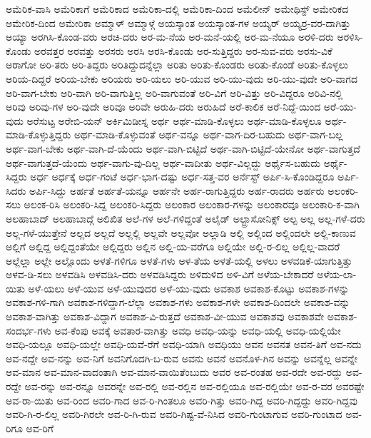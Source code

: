 {ಅಮೆರಿಕ-ವಾಸಿ
ಅಮೆರಿಕಾಗೆ
ಅಮೆರಿಕಾದ
ಅಮೆರಿಕಾ-ದಲ್ಲಿ
ಅಮೆರಿಕಾ-ದಿಂದ
ಅಮೆಲೀನ್
ಅಮೇಥಿಸ್ಟ್
ಅಮೇರಿಕದ
ಅಮೇರಿಕ-ದಿಂದ
ಅಮೇರಿಕಾ
ಅಮ್ಮಾಳ್
ಅಮ್ಮಾಳ್ಗೆ
ಅಯಸ್ಕಾಂತ
ಅಯಸ್ಕಾಂತ-ಗಳ
ಅಯ್ಯರ್
ಅಯ್ಯರ್ರ-ವರ-ದಾಗಿತ್ತು
ಅಯ್ಯಾ
ಅರಗಿಸಿ-ಕೊಂಡ-ವರು
ಅರಚಿ-ದರು
ಅರ-ಮ-ನೆಯ
ಅರ-ಮನೆ-ಯಲ್ಲಿ
ಅರ-ಮ-ನೆಯೂ
ಅರಳಿ-ದರು
ಅರಳಿಸಿ-ಕೊಂಡು
ಅರವತ್ತರ
ಅರವತ್ತು
ಅರಸರು
ಅರಸಿ
ಅರಸಿ-ಕೊಂಡು
ಅರ-ಸುತ್ತಿದ್ದರು
ಅರ-ಸುವ-ವರು
ಅರಸು-ವಿಕೆ
ಅರಾಗೋ
ಅರಿ-ತರು
ಅರಿ-ತಿದ್ದರು
ಅರಿತಿದ್ದುದನ್ನೆಲ್ಲಾ
ಅರಿತು
ಅರಿತು-ಕೊಂಡರು
ಅರಿತು-ಕೊಂಡೆ
ಅರಿತು-ಕೊಳ್ಳಲು
ಅರಿಯ-ದಿದ್ದರೆ
ಅರಿಯ-ಬೇಕು
ಅರಿಯರು
ಅರಿ-ಯಲು
ಅರಿ-ಯುವ
ಅರಿ-ಯು-ವುದು
ಅರಿ-ಯು-ವುದೇ
ಅರಿ-ವಾಗದ
ಅರಿ-ವಾಗ-ಬೇಕು
ಅರಿ-ವಾಗಿ
ಅರಿ-ವಾಗುತ್ತಿಲ್ಲ
ಅರಿ-ವಾಗುವಂತೆ
ಅರಿ-ವಿಗೆ
ಅರಿ-ವಿತ್ತು
ಅರಿ-ವಿದ್ದರೂ
ಅರಿವಿ-ನಲ್ಲಿ
ಅರಿವು
ಅರಿವು-ಗಳ
ಅರಿ-ವುದೇ
ಅರಿವೂ
ಅರಿವೇ
ಅರುಹಿ-ದರು
ಅರುಹಿದೆ
ಅರೆ-ಕಾಲಿಕ
ಅರೆ-ನಿದ್ದೆ-ಯಿಂದ
ಅರೆ-ಯು-ವುದು
ಅರೆಸುಟ್ಟ
ಅರೇಬಿ-ಯನ್
ಅರ್ಕಿಮಿಡೀಸ್ನ
ಅರ್ಥ
ಅರ್ಥ-ಮಾಡಿ-ಕೊಳ್ಳಲು
ಅರ್ಥ-ಮಾಡಿ-ಕೊಳ್ಳಲೂ
ಅರ್ಥ-ಮಾಡಿ-ಕೊಳ್ಳುತ್ತಿದ್ದರು
ಅರ್ಥ-ಮಾಡಿ-ಕೊಳ್ಳುವಂತೆ
ಅರ್ಥ-ವನ್ನೂ
ಅರ್ಥ-ವಾಗ-ದಿರ-ಬಹುದು
ಅರ್ಥ-ವಾಗ-ಬಲ್ಲ
ಅರ್ಥ-ವಾಗ-ಬೇಕು
ಅರ್ಥ-ವಾಗಿ-ದೆ-ಯೆಂದು
ಅರ್ಥ-ವಾಗಿ-ಬಿಟ್ಟಿದೆ
ಅರ್ಥ-ವಾಗಿ-ಬಿಟ್ಟಿದೆ-ಯೇನೋ
ಅರ್ಥ-ವಾಗುತ್ತದೆ
ಅರ್ಥ-ವಾಗುತ್ತದೆ-ಯೆಂದು
ಅರ್ಥ-ವಾಗು-ವು-ದಿಲ್ಲ
ಅರ್ಥ-ವಾದೀತು
ಅರ್ಥ-ವಿಲ್ಲದ್ದು
ಅರ್ಥೈಸ-ಬಹುದು
ಅರ್ಥೈ-ಸಿದ್ದರು
ಅರ್ಧ
ಅರ್ಧಕ್ಕೆ
ಅರ್ಧ-ಗಂಟೆ
ಅರ್ಧ-ಭಾಗ-ದಷ್ಟು
ಅರ್ಧ-ಸತ್ತ-ವರ
ಅರ್ನೆಸ್ಟ್
ಅರ್ಪಿ-ಸಿ-ಕೊಂಡಿದ್ದರೂ
ಅರ್ಪಿ-ಸಿದರು
ಅರ್ಪಿ-ಸಿದ್ದು
ಅರ್ಹತೆ
ಅರ್ಹತೆ-ಯನ್ನೂ
ಅರ್ಹನೇ
ಅರ್ಹ-ರಾಗುತ್ತಿದ್ದರು
ಅರ್ಹ-ರಾದರು
ಅರ್ಹರು
ಅಲಂಕರಿ-ಸಲು
ಅಲಂಕ-ರಿಸಿ
ಅಲಂಕರಿ-ಸಿದ್ದ
ಅಲಂಕರಿ-ಸಿದ್ದರು
ಅಲಂಕಾರ
ಅಲಂಕಾರ-ಗಳನ್ನು
ಅಲಂಕಾರವೂ
ಅಲಂಕಾರಿ-ಕ-ವಾಗಿ
ಅಲಹಾಬಾದ್
ಅಲಹಾಬಾದ್ಗೆ
ಅಲಿಖಿತ
ಅಲೆ-ಗಳ
ಅಲೆ-ಗಳಿದ್ದಂತೆ
ಅಲೈಡ್
ಅಲ್ಟ್ರಾಸೋನಿಕ್ಸ್
ಅಲ್ಪ
ಅಲ್ಲ
ಅಲ್ಲ-ಗಳೆ-ದರು
ಅಲ್ಲ-ಗಳೆ-ಯುತ್ತೇನೆ
ಅಲ್ಲದ
ಅಲ್ಲದೆ
ಅಲ್ಲಲ್ಲಿ
ಅಲ್ಲವೇ
ಅಲ್ಲವೋ
ಅಲ್ಲಾಡಿ
ಅಲ್ಲಿ
ಅಲ್ಲಿಂದ
ಅಲ್ಲಿಂದಲೇ
ಅಲ್ಲಿ-ಕಾಣುವ
ಅಲ್ಲಿಗೆ
ಅಲ್ಲಿದ್ದ
ಅಲ್ಲಿದ್ದಂತೆಯೇ
ಅಲ್ಲಿದ್ದರು
ಅಲ್ಲಿನ
ಅಲ್ಲಿ-ಯ-ವರೆಗೂ
ಅಲ್ಲಿಯೇ
ಅಲ್ಲಿ-ರ-ಲಿಲ್ಲ
ಅಲ್ಲಿಲ್ಲ-ವಾದರೆ
ಅಲ್ಲೆಲ್ಲಾ
ಅಲ್ಲೇ
ಅಲ್ಲೊಂದು
ಅಳತೆ-ಗಳಿಗೂ
ಅಳತೆ-ಗಳು
ಅಳ-ತೆಯ
ಅಳತೆ-ಯಲ್ಲಿ
ಅಳಲು
ಅಳವಡಿಕೆ-ಯಾಗುತ್ತಿತ್ತು
ಅಳವ-ಡಿ-ಸಲು
ಅಳವಡಿಸಿ
ಅಳವಡಿಸಿ-ದರು
ಅಳವಡಿಸಿದ್ದರು
ಅಳಿದುಳಿದ
ಅಳಿ-ವಿಗೆ
ಅಳೆಯ-ಬೇಕಾದರೆ
ಅಳೆಯ-ಲಾ-ಯಿತು
ಅಳೆ-ಯಲು
ಅಳೆ-ಯುವ
ಅಳೆ-ಯುವುದರ
ಅಳೆ-ಯು-ವುದು
ಅವಕಾಶ
ಅವಕಾಶ-ಕೊಟ್ಟು
ಅವಕಾಶ-ಗಳನ್ನು
ಅವಕಾಶ-ಗಳಿ-ಗಾಗಿ
ಅವಕಾಶ-ಗಳಿದ್ದಾಗ-ಲೆಲ್ಲಾ
ಅವಕಾಶ-ಗಳು
ಅವಕಾಶ-ಗಳೇ
ಅವಕಾಶ-ದಿಂದಲೇ
ಅವಕಾಶ-ವನ್ನು
ಅವಕಾಶ-ವಾಗಿತ್ತು
ಅವಕಾಶ-ವಿದ್ದಾಗ
ಅವಕಾಶ-ವಿ-ರುತ್ತದೆ
ಅವಕಾಶ-ವೀ-ಯುವ
ಅವಕಾಶವು
ಅವಕಾಶವೇ
ಅವಕಾಶ-ಸಂದರ್ಭ-ಗಳು
ಅವ-ಕೆಂಪು
ಅವಕ್ಕೆ
ಅವತಾರ-ವಾಗಿತ್ತು
ಅವಧಿ
ಅವಧಿ-ಯನ್ನು
ಅವಧಿ-ಯಲ್ಲಿ
ಅವಧಿ-ಯಲ್ಲಿಯೇ
ಅವಧಿ-ಯಲ್ಲೂ
ಅವಧಿ-ಯಲ್ಲೇ
ಅವಧಿ-ಯವೆ-ರೆಗೆ
ಅವಧಿ-ಯಾಗಿ
ಅವಧಿಯು
ಅವನ
ಅವನತ
ಅವನ-ತಿಗೆ
ಅವ-ನದು
ಅವ-ನದ್ದೇ
ಅವ-ನನ್ನು
ಅವ-ನಿಗೆ
ಅವನಿಗೊದಗಿ-ಬ-ರುವ
ಅವನು
ಅವನೆ
ಅವನೊಳ-ಗಿನ
ಅವನ್ನು
ಅವನ್ನೆಲ್ಲ
ಅವನ್ನೇ
ಅವ-ಮಾನ
ಅವ-ಮಾನ-ವಾದಂತಾಗಿ
ಅವ-ಮಾನ-ವಾಯಿತೆಂಬುದು
ಅವರ
ಅವ-ರಂತಹ
ಅವ-ರದೇ
ಅವ-ರದ್ದು
ಅವ-ರದ್ದೇ
ಅವ-ರನ್ನು
ಅವ-ರನ್ನೂ
ಅವರನ್ನೇ
ಅವ-ರಲ್ಲಿ
ಅವ-ರಲ್ಲಿನ
ಅವ-ರಲ್ಲಿಯೂ
ಅವ-ರಲ್ಲಿಯೇ
ಅವ-ರ-ವರ
ಅವರಷ್ಟೇ
ಅವ-ರಾ-ಯಿತು
ಅವ-ರಿಂದ
ಅವರಿ-ಗಾದ
ಅವ-ರಿ-ಗಿಂತಲೂ
ಅವರಿ-ಗಿತ್ತು
ಅವರಿ-ಗಿದ್ದ
ಅವರಿ-ಗಿದ್ದದ್ದು
ಅವರಿ-ಗಿದ್ದವು
ಅವರಿ-ಗಿ-ರ-ಲಿಲ್ಲ
ಅವರಿ-ಗಿರಲೇ
ಅವ-ರಿ-ಗಿ-ರುವ
ಅವರಿ-ಗಿಷ್ಟ-ವೆ-ನಿಸಿದ
ಅವರಿ-ಗುಂಟಾಗುವ
ಅವರಿ-ಗುಂಟಾದ
ಅವ-ರಿಗೂ
ಅವ-ರಿಗೆ
}
